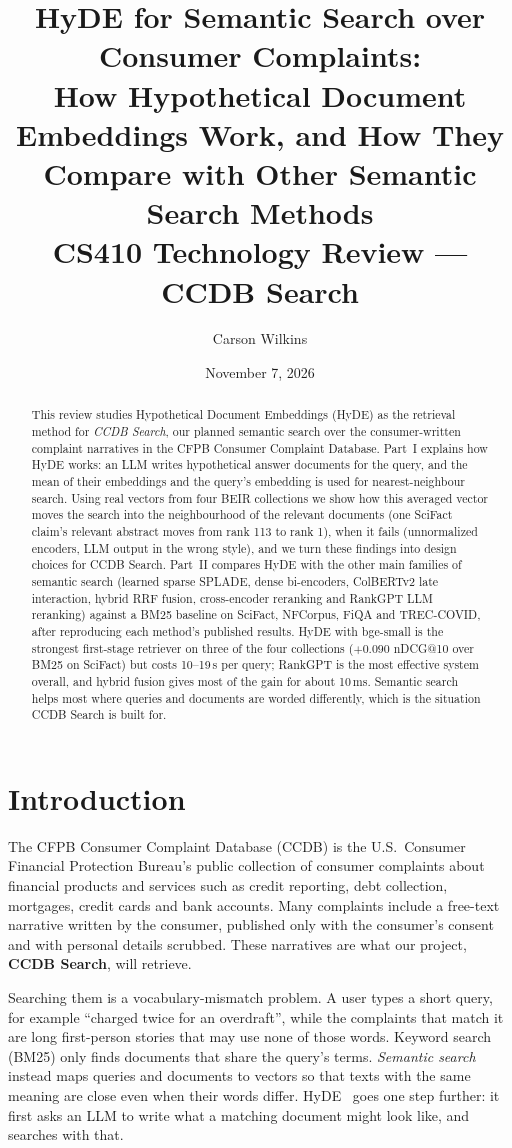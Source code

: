 \documentclass[11pt]{article}
\title{HyDE for Semantic Search over Consumer Complaints:\\ How Hypothetical Document Embeddings Work,
and How They Compare with Other Semantic Search Methods\\[4pt]
\large CS410 Technology Review --- CCDB Search}
\author{Carson Wilkins}
\date{November 7, 2026}
\begin{document}
\maketitle

\begin{abstract}
\sloppy
This review studies Hypothetical Document Embeddings (HyDE) as the retrieval method for \emph{CCDB
Search}, our planned semantic search over the consumer-written complaint narratives in the CFPB
Consumer Complaint Database. Part~I explains how HyDE works: an LLM writes hypothetical answer
documents for the query, and the mean of their embeddings and the query's embedding is used for
nearest-neighbour search. Using real vectors from four BEIR collections we show how this averaged
vector moves the search into the neighbourhood of the relevant documents (one SciFact claim's
relevant abstract moves from rank 113 to rank 1), when it fails (unnormalized encoders, LLM output
in the wrong style), and we turn these findings into design choices for CCDB Search. Part~II compares
HyDE with the other main families of semantic search (learned sparse SPLADE, dense bi-encoders,
ColBERTv2 late interaction, hybrid RRF fusion, cross-encoder reranking and RankGPT LLM reranking)
against a BM25 baseline on SciFact, NFCorpus, FiQA and TREC-COVID, after reproducing each method's
published results. HyDE with bge-small is the strongest first-stage retriever on three of the four
collections ($+0.090$ nDCG@10 over BM25 on SciFact) but costs 10--19\,s per query; RankGPT is the
most effective system overall, and hybrid fusion gives most of the gain for about 10\,ms. Semantic
search helps most where queries and documents are worded differently, which is the situation CCDB
Search is built for.
\end{abstract}

\section{Introduction}\label{sec:intro}
The CFPB Consumer Complaint Database (CCDB) is the U.S.\ Consumer Financial Protection Bureau's public
collection of consumer complaints about financial products and services such as credit reporting,
debt collection, mortgages, credit cards and bank accounts. Many complaints include a free-text
narrative written by the consumer, published only with the consumer's consent and with personal
details scrubbed. These narratives are what our project, \textbf{CCDB Search}, will retrieve.

Searching them is a vocabulary-mismatch problem. A user types a short query, for example ``charged
twice for an overdraft'', while the complaints that match it are long first-person stories that may
use none of those words. Keyword search (BM25) only finds documents that share the query's terms.
\emph{Semantic search} instead maps queries and documents to vectors so that texts with the same
meaning are close even when their words differ. HyDE~\cite{gao2023hyde} goes one step further: it
first asks an LLM to write what a matching document might look like, and searches with that.
\end{document}
